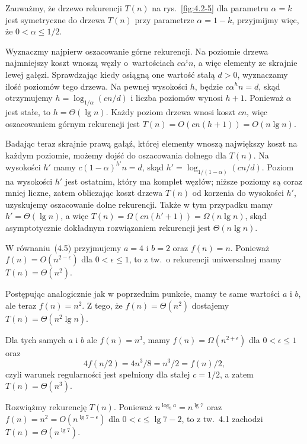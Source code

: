 Zauważmy, że drzewo rekurencji $T(n)$ na rys.~\ref{fig:4.2-5} dla parametru $\alpha=k$ jest symetryczne do drzewa $T(n)$ przy parametrze $\alpha=1-k$, przyjmijmy więc, że $0<\alpha\le1/2$.

Wyznaczmy najpierw oszacowanie górne rekurencji. Na  poziomie drzewa najmniejszy koszt wnoszą węzły o~wartościach $c\alpha^in$, a więc elementy ze skrajnie lewej gałęzi. Sprawdzając kiedy osiągną one wartość stałą $d>0$, wyznaczamy ilość poziomów tego drzewa. Na pewnej wysokości $h$, będzie $c\alpha^hn=d$, skąd otrzymujemy $h=\log_{1/\alpha}(cn/d)$ i liczba poziomów wynosi $h+1$. Ponieważ $\alpha$ jest stałe, to $h=\Theta(\lg n)$. Każdy poziom drzewa wnosi koszt $cn$, więc oszacowaniem górnym rekurencji jest $T(n)=O(cn(h+1))=O(n\lg n)$.

Badając teraz skrajnie prawą gałąź, której elementy wnoszą największy koszt na każdym poziomie, możemy dojść do oszacowania dolnego dla $T(n)$. Na wysokości $h'$ mamy $c(1-\alpha)^{h'}n=d$, skąd $h'=\log_{1/(1-\alpha)}(cn/d)$. Poziom na wysokości $h'$ jest ostatnim, który ma komplet węzłów; niższe poziomy są coraz mniej liczne, zatem obliczając koszt drzewa $T(n)$ od korzenia do wysokości $h'$, uzyskujemy oszacowanie dolne rekurencji. Także w tym przypadku mamy $h'=\Theta(\lg n)$, a więc $T(n)=\Omega(cn(h'+1))=\Omega(n\lg n)$, skąd asymptotycznie dokładnym rozwiązaniem rekurencji jest $\Theta(n\lg n)$.


\exercise{} %

\subexercise{}
W równaniu~(4.5) przyjmujemy $a=4$ i $b=2$ oraz $f(n)=n$. Ponieważ $f(n)=O(n^{2-\epsilon})$ dla $0<\epsilon\le1$, to z tw.~o rekurencji uniwersalnej mamy $T(n)=\Theta(n^2)$.

\subexercise{}
Postępując analogicznie jak w poprzednim punkcie, mamy te same wartości $a$ i $b$, ale teraz $f(n)=n^2$. Z tego, że $f(n)=\Theta(n^2)$ dostajemy $T(n)=\Theta(n^2\lg n)$.

\subexercise{}
Dla tych samych $a$ i $b$ ale $f(n)=n^3$, mamy $f(n)=\Omega(n^{2+\epsilon})$ dla $0<\epsilon\le1$ oraz
\[
	4f(n/2) = 4n^3\!/8 = n^3\!/2 = f(n)/2,
\]
czyli warunek regularności jest spełniony dla stałej $c=1/2$, a zatem $T(n)=\Theta(n^3)$.

\exercise{} %
Rozwiążmy rekurencję $T(n)$. Ponieważ $n^{\log_ba}=n^{\lg7}$ oraz $f(n)=n^2=O(n^{\lg7-\epsilon})$ dla $0<\epsilon\le\lg7-2$, to z tw.~4.1 zachodzi $T(n)=\Theta(n^{\lg7})$.


